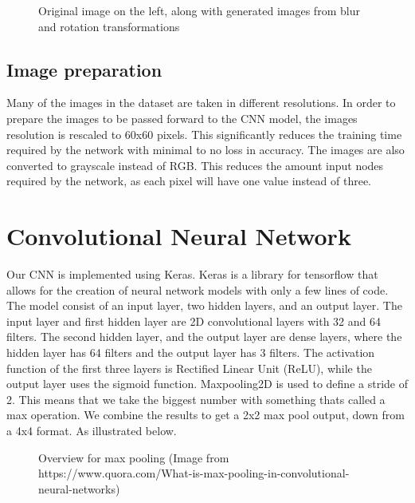 \begin{figure}[h]
    \caption{Original image on the left, along with generated images from blur and rotation transformations}
    \label{fig:figure4.2}
\end{figure}

\subsection{Image preparation}\label{imgprep}
Many of the images in the dataset are taken in different resolutions.
In order to prepare the images to be passed forward to the CNN model, the images resolution is rescaled to 60x60 pixels.
This significantly reduces the training time required by the network with minimal to no loss in accuracy.
The images are also converted to grayscale instead of RGB.
This reduces the amount input nodes required by the network, as each pixel will have one value instead of three.

\section{Convolutional Neural Network}\label{sec:cnn}

Our CNN is implemented using Keras.
Keras is a library for tensorflow that allows for the creation of neural network models with only a few lines of code.
The model consist of an input layer, two hidden layers, and an output layer.
The input layer and first hidden layer are 2D convolutional layers with 32 and 64 filters.
The second hidden layer, and the output layer are dense layers, where the hidden layer has 64 filters and the output layer has 3 filters.
The activation function of the first three layers is Rectified Linear Unit (ReLU), while the output layer uses the sigmoid function.
Maxpooling2D is used to define a stride of 2.
This means that we take the biggest number with something thats called a max operation.
We combine the results to get a 2x2 max pool output, down from a 4x4 format.
As illustrated below.

\begin{figure}[h]
    \caption{Overview for max pooling (Image from https://www.quora.com/What-is-max-pooling-in-convolutional-neural-networks)}
    \label{fig:figure6}

\end{figure}


